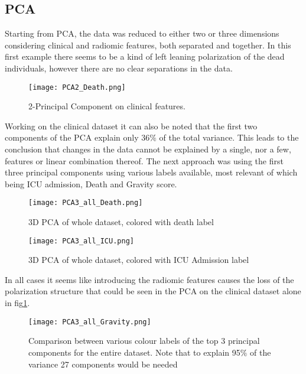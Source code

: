 \subsection{PCA}

Starting from PCA, the data was reduced to either two or three dimensions considering clinical and radiomic features, both separated and together.
In this first example there seems to be a kind of left leaning polarization of the dead individuals, however there are no clear separations in the data.

\begin{figure}[h!]
\centering
  		\texttt{[image: PCA2\_Death.png]}
        \caption{2-Principal Component on clinical features.  \label{fig:PCA2_death}}
\end{figure}

 Working on the clinical dataset it can also be noted that the first two components of the PCA explain only 36$\%$ of the total variance. This leads to the conclusion that changes in the data cannot be explained by a single, nor a few, features or linear combination thereof. The next approach was  using the first three principal components using various labels available, most relevant of which being ICU admission, Death and Gravity score.

\begin{figure}[h!]
  		\texttt{[image: PCA3\_all\_Death.png]}\label{PCA3_all_death}
  		\caption{3D PCA of whole dataset, colored with death label}
\end{figure}

\begin{figure}[h!]
  		\texttt{[image: PCA3\_all\_ICU.png]}\label{PCA3_all_ICU}
  		\caption{3D PCA of whole dataset, colored with ICU Admission label}
\end{figure}

In all cases it seems like introducing the radiomic features causes the loss of the polarization structure that could be seen in the PCA on the clinical dataset alone in fig\ref{fig:PCA2_death}.
 
\begin{figure}[h!]
  		\texttt{[image: PCA3\_all\_Gravity.png]}\label{PCA3_all_gravity}
          \caption{Comparison between various colour labels of the top 3 principal components for the entire dataset. Note that to explain 95$\%$ of the variance 27 components would be needed}
\end{figure}

